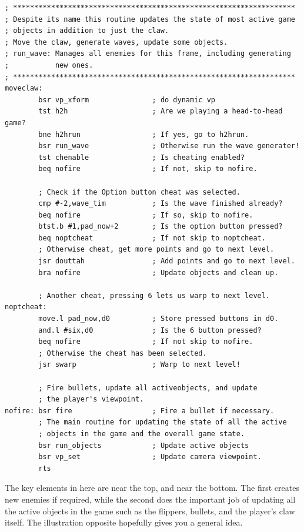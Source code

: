 \begin{lstlisting}
; *******************************************************************
; Despite its name this routine updates the state of most active game
; objects in addition to just the claw.
; Move the claw, generate waves, update some objects.
; run_wave: Manages all enemies for this frame, including generating
;           new ones.
; *******************************************************************
moveclaw:
        bsr vp_xform               ; do dynamic vp
        tst h2h                    ; Are we playing a head-to-head game?
        bne h2hrun                 ; If yes, go to h2hrun.
        bsr run_wave               ; Otherwise run the wave generater!
        tst chenable               ; Is cheating enabled?
        beq nofire                 ; If not, skip to nofire.

        ; Check if the Option button cheat was selected.
        cmp #-2,wave_tim           ; Is the wave finished already?
        beq nofire                 ; If so, skip to nofire.
        btst.b #1,pad_now+2        ; Is the option button pressed? 
        beq noptcheat              ; If not skip to noptcheat.
        ; Otherwise cheat, get more points and go to next level.
        jsr douttah                ; Add points and go to next level.
        bra nofire                 ; Update objects and clean up.
    
        ; Another cheat, pressing 6 lets us warp to next level.
noptcheat:
        move.l pad_now,d0          ; Store pressed buttons in d0.
        and.l #six,d0              ; Is the 6 button pressed?
        beq nofire                 ; If not skip to nofire.
        ; Otherwise the cheat has been selected.
        jsr swarp                  ; Warp to next level!

        ; Fire bullets, update all activeobjects, and update
        ; the player's viewpoint.
nofire: bsr fire                   ; Fire a bullet if necessary.
        ; The main routine for updating the state of all the active
        ; objects in the game and the overall game state.
        bsr run_objects            ; Update active objects
        bsr vp_set                 ; Update camera viewpoint.
        rts
\end{lstlisting}

The key elements in here are  near the top, and 
near the bottom. The first creates new enemies if required, while the second does
the important job of updating all the active objects in the game such as the flippers,
bullets, and the player's claw itself. The illustration opposite hopefully gives you a
general idea.

